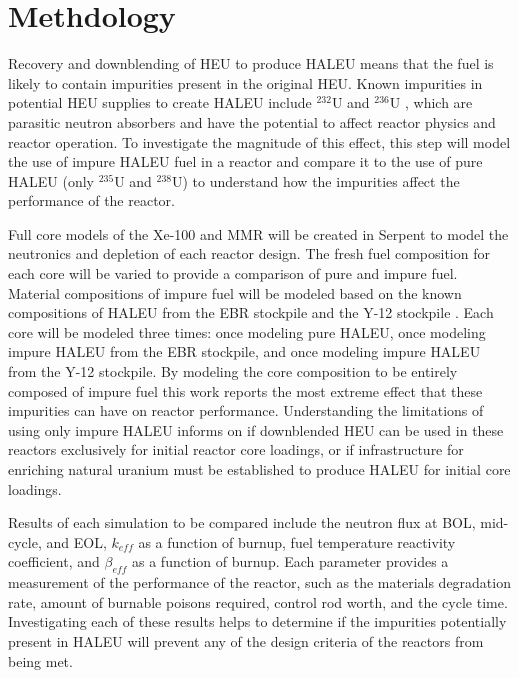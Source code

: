 \section{Methdology}
Recovery and downblending of \gls{HEU} to produce \gls{HALEU} means that 
the fuel is likely to contain impurities present in the original
\gls{HEU}. Known impurities in potential \gls{HEU}
supplies to create \gls{HALEU} include $^{232}$U and $^{236}$U
\cite{vaden_isotopic_2018,nelson_foreign_2010},  
which are parasitic neutron absorbers and have the potential to affect 
reactor physics and reactor operation. To investigate the magnitude of this 
effect, this step will model the use of 
impure \gls{HALEU} fuel in a reactor and compare it to the use of pure 
\gls{HALEU} (only $^{235}$U and $^{238}$U)
to understand how the impurities affect the performance of the reactor. 

Full core models of the Xe-100 and \gls{MMR} will be created in Serpent 
\cite{leppanen_serpent_2014} to model the neutronics and depletion of 
each reactor 
design. The fresh fuel composition for each core will be varied to provide 
a comparison of pure and impure fuel.
Material compositions of impure fuel will be modeled based on the 
known compositions of \gls{HALEU} from the \gls{EBR} stockpile 
\cite{vaden_isotopic_2018} and the Y-12 stockpile \cite{nelson_foreign_2010}.
Each core will be modeled three times: once modeling pure \gls{HALEU}, 
once modeling impure \gls{HALEU} from the \gls{EBR} stockpile, and once 
modeling impure \gls{HALEU} from the Y-12 stockpile.
By modeling the core composition to be entirely composed of impure fuel 
this work reports the most extreme effect that these impurities can 
have on reactor performance. Understanding the limitations of using only 
impure \gls{HALEU} informs on if downblended \gls{HEU} can be used in 
these reactors exclusively for initial reactor core loadings, or if 
infrastructure for enriching natural uranium must be established to 
produce \gls{HALEU} for initial core loadings. 

Results of each simulation to be compared include the neutron flux at 
\gls{BOL}, mid-cycle, and \gls{EOL}, $k_{eff}$ as a function of burnup, 
fuel temperature reactivity coefficient, and 
$\beta_{eff}$ as a function of burnup. Each parameter provides a 
measurement of the performance of 
the reactor, such as the materials degradation rate, amount of burnable 
poisons required, control rod worth, and the cycle time. Investigating 
each of these results helps to determine if the impurities potentially 
present in \gls{HALEU} will prevent any of the design criteria of the 
reactors from being met. 